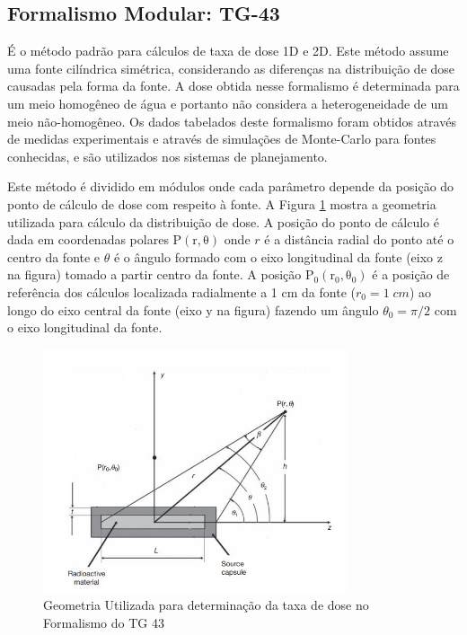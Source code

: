 \documentclass[11pt,a4paper]{article}
\begin{document}
		\subsection{Formalismo Modular: TG-43}

			É o método padrão para cálculos de taxa de dose 1D e 2D. Este método assume uma fonte cilíndrica simétrica, considerando as diferenças na distribuição de dose causadas pela forma da fonte. A dose obtida nesse formalismo é determinada para um meio homogêneo de água e portanto não considera a heterogeneidade de um meio não-homogêneo. Os dados tabelados deste formalismo foram obtidos através de medidas experimentais e através de simulações de Monte-Carlo para fontes conhecidas, e são utilizados nos sistemas de planejamento.

			Este método é dividido em módulos onde cada parâmetro depende da posição do ponto de cálculo de dose com respeito à fonte. A Figura \ref{img:FormalismoTg43} mostra a geometria utilizada para cálculo da distribuição de dose. A posição do ponto de cálculo é dada em coordenadas polares $\mathrm{P(r, \theta)}$ onde $r$ é a distância radial do ponto até o centro da fonte e $\theta$ é o ângulo formado com o eixo longitudinal da fonte (eixo z na figura) tomado a partir centro da fonte. A posição $\mathrm{P_0(r_0, \theta_0)}$ é a posição de referência dos cálculos localizada radialmente a 1 cm da fonte ($r_0 = 1 \; cm$) ao longo do eixo central da fonte (eixo y na figura) fazendo um ângulo $\theta_0 = \pi / 2$ com o eixo longitudinal da fonte.


				\begin{figure}[h]
					\centering
					\includegraphics[width=0.8\textwidth]{Imagens/esquemaFormalismoTg43.JPG}
					\caption{Geometria Utilizada para determinação da taxa de dose no Formalismo do TG 43}
					\label{img:FormalismoTg43}
				\end{figure}
\end{document}
